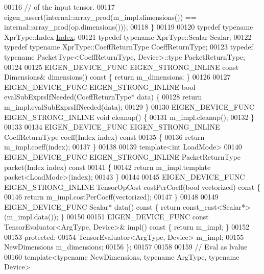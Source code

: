 \begin{DoxyCode}
00116     \textcolor{comment}{// of the input tensor.}
00117     eigen\_assert(internal::array\_prod(m\_impl.dimensions()) == internal::array\_prod(op.dimensions()));
00118   \}
00119 
00120   \textcolor{keyword}{typedef} \textcolor{keyword}{typename} XprType::Index \hyperlink{namespace_eigen_a62e77e0933482dafde8fe197d9a2cfde}{Index};
00121   \textcolor{keyword}{typedef} \textcolor{keyword}{typename} XprType::Scalar Scalar;
00122   \textcolor{keyword}{typedef} \textcolor{keyword}{typename} XprType::CoeffReturnType CoeffReturnType;
00123   \textcolor{keyword}{typedef} \textcolor{keyword}{typename} PacketType<CoeffReturnType, Device>::type PacketReturnType;
00124 
00125   EIGEN\_DEVICE\_FUNC EIGEN\_STRONG\_INLINE \textcolor{keyword}{const} Dimensions& dimensions()\textcolor{keyword}{ const }\{ \textcolor{keywordflow}{return} m\_dimensions; \}
00126 
00127   EIGEN\_DEVICE\_FUNC EIGEN\_STRONG\_INLINE \textcolor{keywordtype}{bool} evalSubExprsIfNeeded(CoeffReturnType* data) \{
00128     \textcolor{keywordflow}{return} m\_impl.evalSubExprsIfNeeded(data);
00129   \}
00130   EIGEN\_DEVICE\_FUNC EIGEN\_STRONG\_INLINE \textcolor{keywordtype}{void} cleanup() \{
00131     m\_impl.cleanup();
00132   \}
00133 
00134   EIGEN\_DEVICE\_FUNC EIGEN\_STRONG\_INLINE CoeffReturnType coeff(Index index)\textcolor{keyword}{ const}
00135 \textcolor{keyword}{  }\{
00136     \textcolor{keywordflow}{return} m\_impl.coeff(index);
00137   \}
00138 
00139   \textcolor{keyword}{template}<\textcolor{keywordtype}{int} LoadMode>
00140   EIGEN\_DEVICE\_FUNC EIGEN\_STRONG\_INLINE PacketReturnType packet(Index index)\textcolor{keyword}{ const}
00141 \textcolor{keyword}{  }\{
00142     \textcolor{keywordflow}{return} m\_impl.template packet<LoadMode>(index);
00143   \}
00144 
00145   EIGEN\_DEVICE\_FUNC EIGEN\_STRONG\_INLINE TensorOpCost costPerCoeff(\textcolor{keywordtype}{bool} vectorized)\textcolor{keyword}{ const }\{
00146     \textcolor{keywordflow}{return} m\_impl.costPerCoeff(vectorized);
00147   \}
00148 
00149   EIGEN\_DEVICE\_FUNC Scalar* data()\textcolor{keyword}{ const }\{ \textcolor{keywordflow}{return} \textcolor{keyword}{const\_cast<}Scalar*\textcolor{keyword}{>}(m\_impl.data()); \}
00150 
00151   EIGEN\_DEVICE\_FUNC \textcolor{keyword}{const} TensorEvaluator<ArgType, Device>& impl()\textcolor{keyword}{ const }\{ \textcolor{keywordflow}{return} m\_impl; \}
00152 
00153  \textcolor{keyword}{protected}:
00154   TensorEvaluator<ArgType, Device> m\_impl;
00155   NewDimensions m\_dimensions;
00156 \};
00157 
00158 
00159 \textcolor{comment}{// Eval as lvalue}
00160 \textcolor{keyword}{template}<\textcolor{keyword}{typename} NewDimensions, \textcolor{keyword}{typename} ArgType, \textcolor{keyword}{typename} Device>

\end{DoxyCode}

